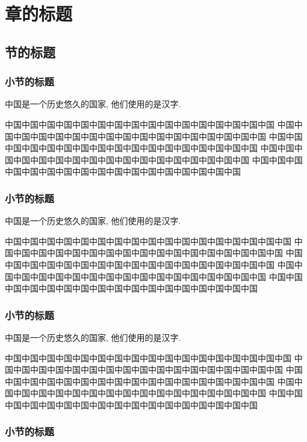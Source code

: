 \chapter{章的标题}

\section{节的标题}

\subsection{小节的标题}

中国是一个历史悠久的国家, 他们使用的是汉字.

中国中国中国中国中国中国中国中国中国中国中国中国中国中国中国中国
中国中国中国中国中国中国中国中国中国中国中国中国中国中国中国中国\citep{aigner2007}中国
中国中国中国中国中国中国中国中国中国中国中国中国中国中国中国中国中国
中国中国中国中国中国中国中国中国中国中国中国中国中国中国中国中国中国
中国中国中国中国中国中国中国中国中国中国中国中国中国中国中国中国中国

\subsection{小节的标题}

中国是一个历史悠久的国家, 他们使用的是汉字.

中国中国中国中国中国中国中国中国中国中国中国中国中国中国中国中国中国
中国中国中国中国中国中国中国中国中国中国中国中国中国中国中国中国中国
中国中国中国中国中国中国中国中国中国中国中国中国中国中国中国中国中国
中国中国中国中国中国中国中国中国中国中国中国中国中国中国中国中国中国
中国中国中国中国中国中国中国中国中国中国中国中国中国中国中国中国中国

\subsection{小节的标题}

中国是一个历史悠久的国家, 他们使用的是汉字.

中国中国中国中国中国中国中国中国中国中国中国中国中国中国中国中国中国
中国中国中国中国中国中国中国中国中国中国中国中国中国中国中国中国中国
中国中国中国中国中国中国中国中国中国中国中国中国中国中国中国中国中国
中国中国中国中国中国中国中国中国中国中国中国中国中国中国中国中国中国
中国中国中国中国中国中国中国中国中国中国中国中国中国中国中国中国中国

\subsection{小节的标题}

